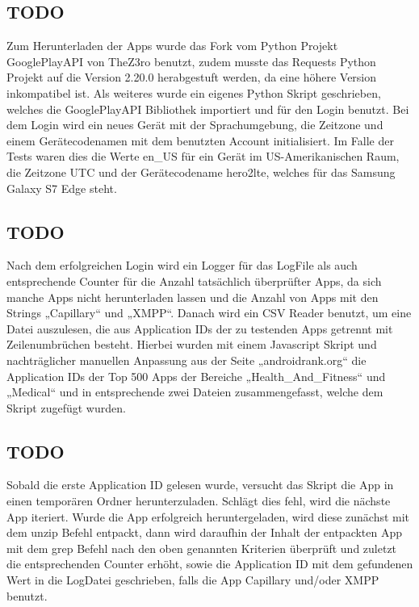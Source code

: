 \documentclass[sigconf]{acmart}
\begin{document}
\subsection{TODO}
Zum Herunterladen der Apps wurde das Fork vom Python Projekt GooglePlayAPI 
von TheZ3ro benutzt, zudem musste das Requests Python Projekt auf die Version 
2.20.0 herabgestuft werden, da eine höhere Version inkompatibel ist. 
Als weiteres wurde ein eigenes Python Skript geschrieben, welches die 
GooglePlayAPI Bibliothek importiert und für den Login benutzt. Bei dem Login 
wird ein neues Gerät mit der Sprachumgebung, die Zeitzone und einem 
Gerätecodenamen mit dem benutzten Account initialisiert. Im Falle der Tests 
waren dies die Werte en\_US für ein Gerät im US-Amerikanischen Raum, die 
Zeitzone UTC und der Gerätecodename hero2lte, welches für das Samsung 
Galaxy S7 Edge steht.

\subsection{TODO}
Nach dem erfolgreichen Login wird ein Logger für das LogFile als auch 
entsprechende Counter für die Anzahl tatsächlich überprüfter Apps, da sich 
manche Apps nicht herunterladen lassen und die Anzahl von Apps mit den 
Strings „Capillary“ und „XMPP“.
Danach wird ein CSV Reader benutzt, um eine Datei auszulesen, die aus 
Application IDs der zu testenden Apps getrennt mit Zeilenumbrüchen besteht. 
Hierbei wurden mit einem Javascript Skript und nachträglicher manuellen 
Anpassung aus der Seite „androidrank.org“ die Application IDs der Top 500 
Apps der Bereiche „Health\_And\_Fitness“ und „Medical“ und in entsprechende 
zwei Dateien zusammengefasst, welche dem Skript zugefügt wurden.

\subsection{TODO}
Sobald die erste Application ID gelesen wurde, versucht das Skript die App 
in einen temporären Ordner herunterzuladen. Schlägt dies fehl, wird die 
nächste App iteriert. Wurde die App erfolgreich heruntergeladen, wird diese 
zunächst mit dem unzip Befehl entpackt, dann wird daraufhin der Inhalt der 
entpackten App mit dem grep Befehl nach den oben genannten Kriterien 
überprüft und zuletzt die entsprechenden Counter erhöht, sowie die 
Application ID mit dem gefundenen Wert in die LogDatei geschrieben, falls 
die App Capillary und/oder XMPP benutzt.
\end{document}
